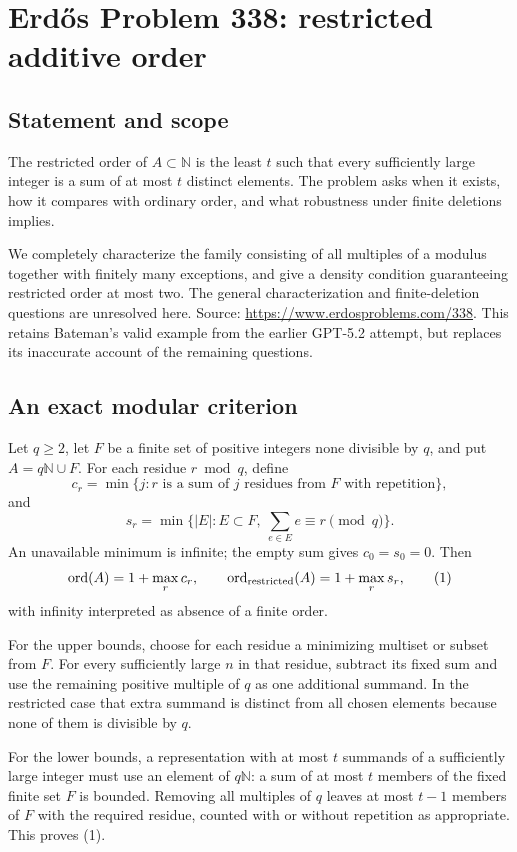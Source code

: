 \section*{Erd\H{o}s Problem 338: restricted additive order}
\subsection*{Statement and scope}
The restricted order of $A\subset\mathbb N$ is the least $t$ such that every sufficiently large integer is a sum of at most $t$ distinct elements. The problem asks when it exists, how it compares with ordinary order, and what robustness under finite deletions implies.

We completely characterize the family consisting of all multiples of a modulus together with finitely many exceptions, and give a density condition guaranteeing restricted order at most two. The general characterization and finite-deletion questions are unresolved here. Source: \url{https://www.erdosproblems.com/338}. This retains Bateman's valid example from the earlier GPT-5.2 attempt, but replaces its inaccurate account of the remaining questions.

\subsection*{An exact modular criterion}
Let $q\ge2$, let $F$ be a finite set of positive integers none divisible by $q$, and put $A=q\mathbb N\cup F$. For each residue $r\bmod q$, define
\[
 c_r=\min\{j:r\text{ is a sum of }j\text{ residues from }F
                  \text{ with repetition}\},
\]
and
\[
 s_r=\min\{|E|:E\subset F,\ \sum_{e\in E}e\equiv r\pmod q\}.
\]
An unavailable minimum is infinite; the empty sum gives $c_0=s_0=0$. Then
\[
 \operatorname{ord}(A)=1+\max_r c_r,\qquad
 \operatorname{ord}_{\rm restricted}(A)=1+\max_r s_r, \tag{1}
\]
with infinity interpreted as absence of a finite order.

For the upper bounds, choose for each residue a minimizing multiset or subset from $F$. For every sufficiently large $n$ in that residue, subtract its fixed sum and use the remaining positive multiple of $q$ as one additional summand. In the restricted case that extra summand is distinct from all chosen elements because none of them is divisible by $q$.

For the lower bounds, a representation with at most $t$ summands of a sufficiently large integer must use an element of $q\mathbb N$: a sum of at most $t$ members of the fixed finite set $F$ is bounded. Removing all multiples of $q$ leaves at most $t-1$ members of $F$ with the required residue, counted with or without repetition as appropriate. This proves (1).

